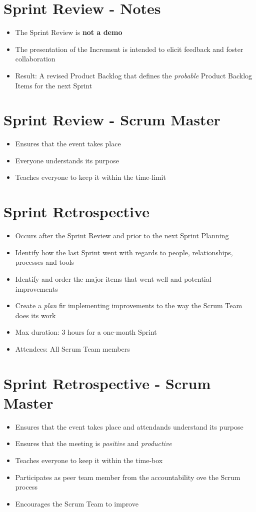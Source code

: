 \documentclass[a4paper,11pt,twocolumn]{article}
\begin{document}
\section*{Sprint Review - Notes}
\begin{itemize}
	\item The Sprint Review is \textbf{not a demo}
	\item The presentation of the Increment is intended to elicit feedback and foster collaboration
	\item Result: A revised Product Backlog that defines the \textit{probable} Product Backlog Items for the next Sprint
\end{itemize}

\section*{Sprint Review - Scrum Master}
\begin{itemize}
	\item Ensures that the event takes place
	\item Everyone understands its purpose
	\item Teaches everyone to keep it within the time-limit
\end{itemize}

\section*{Sprint Retrospective}
\begin{itemize}
	\item Occurs after the Sprint Review and prior to the next Sprint Planning
	\item Identify how the last Sprint went with regards to people, relationships, processes and tools
	\item Identify and order the major items that went well and potential improvements
	\item Create a \textit{plan} fir implementing improvements to the way the Scrum Team does its work
	\item Max duration: 3 hours for a one-month Sprint
	\item Attendees: All Scrum Team members
\end{itemize}

\section*{Sprint Retrospective - Scrum Master}
\begin{itemize}
	\item Ensures that the event takes place and attendands understand its purpose
	\item Ensures that the meeting is \textit{positive} and \textit{productive}
	\item Teaches everyone to keep it within the time-box
	\item Participates as peer team member from the accountability ove the Scrum process
	\item Encourages the Scrum Team to improve
\end{itemize}
\end{document}
